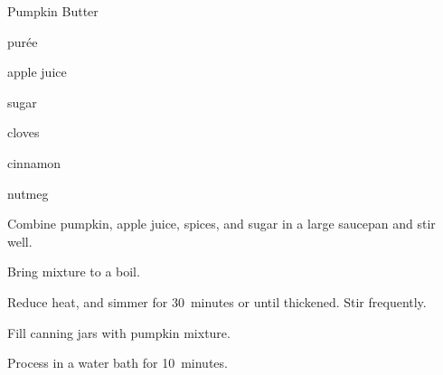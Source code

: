 \begin{recipe}{Pumpkin Butter}{}{}

\begin{ingredients}
\item \C{3\threequarter}  pur\'ee
\item \C{\threequarter} apple juice
\item \C{1\half} sugar
\item {} 
\item \tp{\half} cloves
\item {} cinnamon
\item {} nutmeg
\end{ingredients}

\begin{directions}
\item Combine pumpkin, apple juice, spices, and sugar in a large saucepan and stir well.
\item Bring mixture to a boil.
\item Reduce heat, and simmer for 30~minutes or until thickened. Stir frequently.
\item Fill canning jars with pumpkin mixture.
\item Process in a water bath for 10~minutes.
\end{directions}
\end{recipe}
